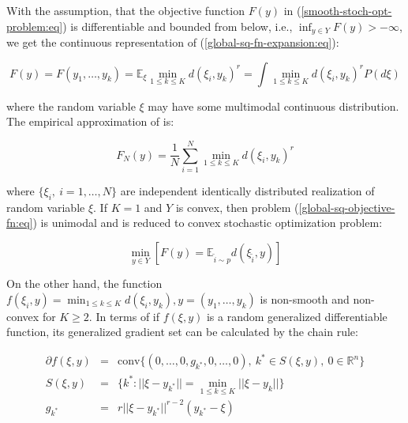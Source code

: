With the assumption, that the objective function $ F(y) $ in (\ref{smooth-stoch-opt-problem:eq}) is differentiable and bounded from below, i.e., $ \inf_{y \in Y} F(y) > - \infty $, we get the continuous representation of (\ref{global-sq-fn-expansion:eq}):

\begin{equation}
    \label{smooth-stoch-fn-expansion:eq}
        F(y) = F(y_1, \ldots, y_k) = \mathbb{E}_{\xi} \min_{1 \leq k \leq K} d(\xi_i, y_k)^r = \int \min_{1 \leq k \leq K} d(\xi_i, y_k)^r P(d \xi)
\end{equation}

\noindent where the random variable $ \xi $ may have some multimodal continuous distribution. The empirical approximation of is:

\begin{equation}
    \label{empirical-stoch-fn-expansion:eq}
        F_N(y) = \frac{1}{N} \sum_{i=1}^N \min_{1 \leq k \leq K} d(\xi_i, y_k)^r
\end{equation}

\noindent where $ \{ \xi_i, \> i = 1, \ldots, N \} $ are independent identically distributed realization of random variable $ \xi $. If $ K = 1 $ and $ Y $ is convex, then problem (\ref{global-sq-objective-fn:eq}) is unimodal and is reduced to convex stochastic optimization problem:

\begin{equation}
    \label{convex-stoch-opt-problem:eq}
        \min_{y \in Y} [ F(y) =  \mathbb{E}_{\tilde{i} \sim p} d(\xi_{\tilde{i}}, y) ]
\end{equation}

On the other hand, the function $ f(\xi_i, y) = \min_{1 \leq k \leq K} d(\xi_i, y_k), y = (y_1, \ldots, y_k) $ is non-smooth and non-convex for $ K \geq 2 $. In terms of \cite{mikhalevich2024,Norkin_1986} if $ f(\xi, y) $ is a random generalized differentiable function, its generalized gradient set can be calculated by the chain rule:

\begin{eqnarray}
    \label{sq-objective-fn-gradient:eq}
        \partial f(\xi, y) &=& \text{conv} \{ (0, \ldots, 0, g_{k^*}, 0, \ldots, 0), \> k^* \in S(\xi, y), \> 0 \in \mathbb{R}^n \} \nonumber \\
        S(\xi, y) &=& \{ k^*: || \xi - y_{k^*} || = \min_{1 \leq k \leq K} || \xi - y_k || \} \nonumber \\
        g_{k^*} &=& r || \xi - y_{k^*} ||^{r - 2} (y_{k^*} - \xi)
\end{eqnarray}

